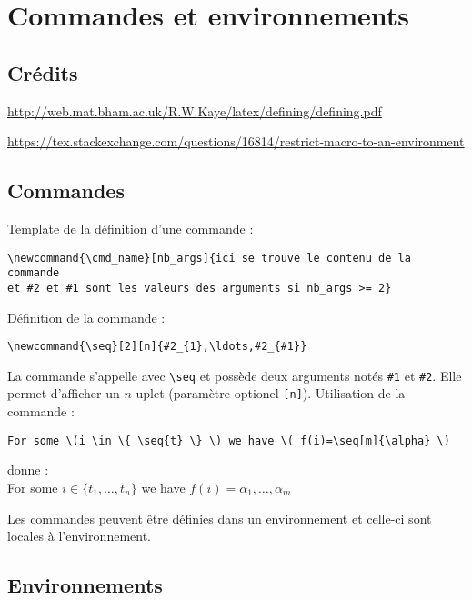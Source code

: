 \chapter{Commandes et environnements}
\minitoc


\newpage
\section{Crédits}

\url{http://web.mat.bham.ac.uk/R.W.Kaye/latex/defining/defining.pdf}


\url{https://tex.stackexchange.com/questions/16814/restrict-macro-to-an-environment}

\section{Commandes}

Template de la définition d'une commande :
\begin{verbatim}
\newcommand{\cmd_name}[nb_args]{ici se trouve le contenu de la commande
et #2 et #1 sont les valeurs des arguments si nb_args >= 2}
\end{verbatim}


\newcommand{\seq}[2][n]{#2_{1},\ldots,#2_{#1}}
Définition de la commande :
\begin{verbatim}
\newcommand{\seq}[2][n]{#2_{1},\ldots,#2_{#1}}
\end{verbatim}

La commande s'appelle avec \verb+\seq+ et possède deux arguments notés \verb+#1+ et \verb+#2+. Elle permet d'afficher un $n$-uplet (paramètre optionel \verb+[n]+).
Utilisation de la commande :
\begin{verbatim}
For some \(i \in \{ \seq{t} \} \) we have \( f(i)=\seq[m]{\alpha} \)
\end{verbatim}
donne :\\
For some \(i \in \{ \seq{t} \} \) we have \( f(i)=\seq[m]{\alpha} \)

\bigskip
\par
Les commandes peuvent être définies dans un environnement et celle-ci sont locales à l'environnement.

\section{Environnements}

\newenvironment{qsi}[1]%
{\begin{quote}#1 wrote,\begin{sloppypar}\it}%
{\end{sloppypar}\end{quote}}



